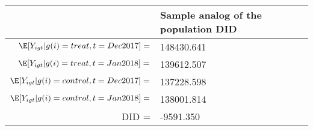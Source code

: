 \begin{tabular}{rl}
\toprule
 & Sample analog of the population DID \\
\midrule
$\E[Y_{igt}|g(i)=treat, t=Dec2017]=$ & 148430.641 \\
$\E[Y_{igt}|g(i)=treat, t=Jan2018]=$ & 139612.507 \\
$\E[Y_{igt}|g(i)=control, t=Dec2017]=$ & 137228.598 \\
$\E[Y_{igt}|g(i)=control, t=Jan2018]=$ & 138001.814 \\
\midrule DID = & -9591.350 \\
\bottomrule
\end{tabular}
